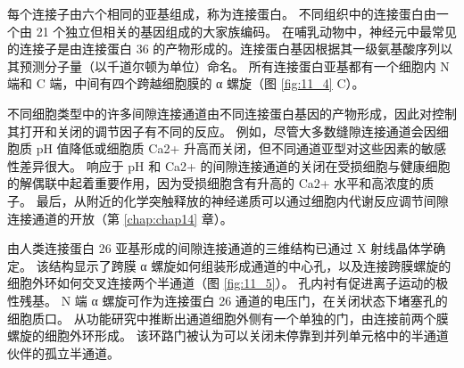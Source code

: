 每个连接子由六个相同的亚基组成，称为连接蛋白。 
不同组织中的连接蛋白由一个由 21 个独立但相关的基因组成的大家族编码。 
在哺乳动物中，神经元中最常见的连接子是由连接蛋白 36 的产物形成的。连接蛋白基因根据其一级氨基酸序列以其预测分子量（以千道尔顿为单位）命名。 
所有连接蛋白亚基都有一个细胞内 N 端和 C 端，中间有四个跨越细胞膜的 α 螺旋（图 \ref{fig:11_4} C）。


不同细胞类型中的许多间隙连接通道由不同连接蛋白基因的产物形成，因此对控制其打开和关闭的调节因子有不同的反应。 
例如，尽管大多数缝隙连接通道会因细胞质 pH 值降低或细胞质 Ca2+ 升高而关闭，但不同通道亚型对这些因素的敏感性差异很大。 
响应于 pH 和 Ca2+ 的间隙连接通道的关闭在受损细胞与健康细胞的解偶联中起着重要作用，因为受损细胞含有升高的 Ca2+ 水平和高浓度的质子。 
最后，从附近的化学突触释放的神经递质可以通过细胞内代谢反应调节间隙连接通道的开放（第 \ref{chap:chap14} 章）。


由人类连接蛋白 26 亚基形成的间隙连接通道的三维结构已通过 X 射线晶体学确定。 
该结构显示了跨膜 α 螺旋如何组装形成通道的中心孔，以及连接跨膜螺旋的细胞外环如何交叉连接两个半通道（图 \ref{fig:11_5}）。 
孔内衬有促进离子运动的极性残基。 
N 端 α 螺旋可作为连接蛋白 26 通道的电压门，在关闭状态下堵塞孔的细胞质口。 
从功能研究中推断出通道细胞外侧有一个单独的门，由连接前两个膜螺旋的细胞外环形成。 
该环路门被认为可以关闭未停靠到并列单元格中的半通道伙伴的孤立半通道。

